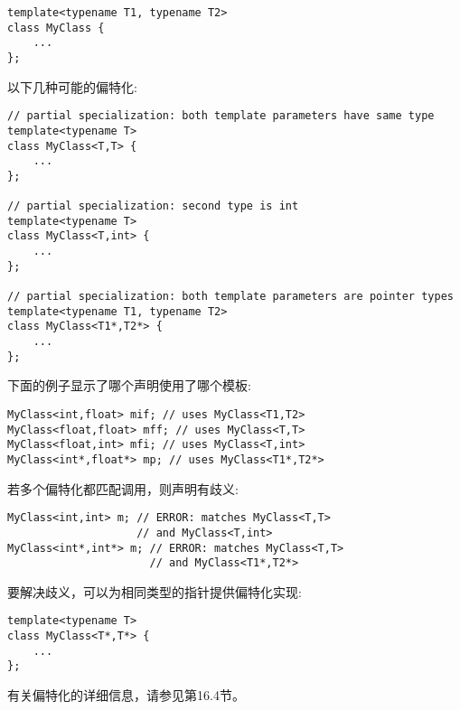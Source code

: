 \begin{lstlisting}[style=styleCXX]
template<typename T1, typename T2>
class MyClass {
	...
};
\end{lstlisting}

以下几种可能的偏特化:

\begin{lstlisting}[style=styleCXX]
// partial specialization: both template parameters have same type
template<typename T>
class MyClass<T,T> {
	...
};

// partial specialization: second type is int
template<typename T>
class MyClass<T,int> {
	...
};

// partial specialization: both template parameters are pointer types
template<typename T1, typename T2>
class MyClass<T1*,T2*> {
	...
};
\end{lstlisting}

下面的例子显示了哪个声明使用了哪个模板:

\begin{lstlisting}[style=styleCXX]
MyClass<int,float> mif; // uses MyClass<T1,T2>
MyClass<float,float> mff; // uses MyClass<T,T>
MyClass<float,int> mfi; // uses MyClass<T,int>
MyClass<int*,float*> mp; // uses MyClass<T1*,T2*>
\end{lstlisting}

若多个偏特化都匹配调用，则声明有歧义:

\begin{lstlisting}[style=styleCXX]
MyClass<int,int> m; // ERROR: matches MyClass<T,T>
					// and MyClass<T,int>
MyClass<int*,int*> m; // ERROR: matches MyClass<T,T>
					  // and MyClass<T1*,T2*>
\end{lstlisting}

要解决歧义，可以为相同类型的指针提供偏特化实现:

\begin{lstlisting}[style=styleCXX]
template<typename T>
class MyClass<T*,T*> {
	...
};
\end{lstlisting}

有关偏特化的详细信息，请参见第16.4节。







